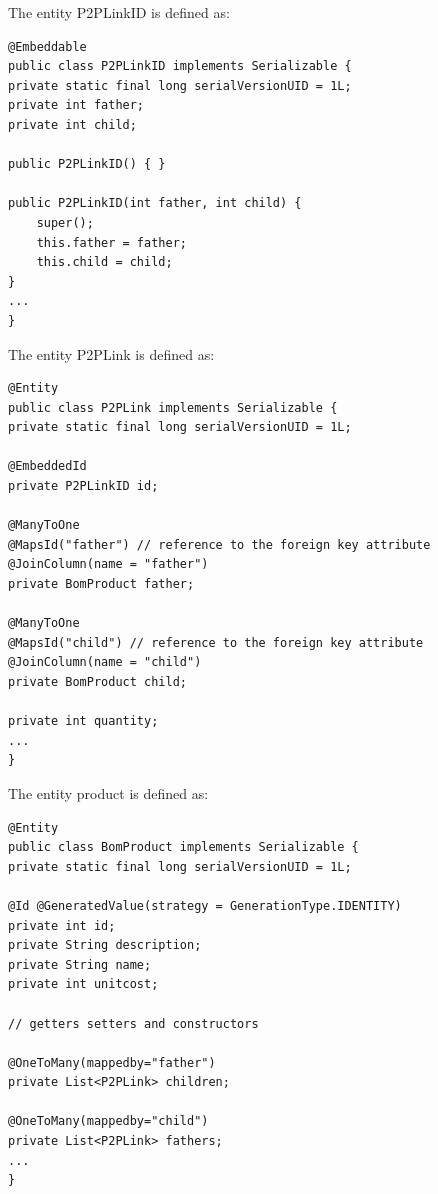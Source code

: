 The entity P2PLinkID is defined as:  
\begin{lstlisting}[style=Java]
@Embeddable
public class P2PLinkID implements Serializable {
private static final long serialVersionUID = 1L;
private int father;
private int child;

public P2PLinkID() { }

public P2PLinkID(int father, int child) {
    super();
    this.father = father;
    this.child = child;
}
...
}
\end{lstlisting}
The entity P2PLink is defined as:  
\begin{lstlisting}[style=Java]
@Entity
public class P2PLink implements Serializable {
private static final long serialVersionUID = 1L;

@EmbeddedId
private P2PLinkID id;

@ManyToOne
@MapsId("father") // reference to the foreign key attribute
@JoinColumn(name = "father")
private BomProduct father;

@ManyToOne
@MapsId("child") // reference to the foreign key attribute
@JoinColumn(name = "child")
private BomProduct child;

private int quantity;
...
}
\end{lstlisting}
The entity product is defined as:  
\begin{lstlisting}[style=Java]
@Entity
public class BomProduct implements Serializable {
private static final long serialVersionUID = 1L;

@Id @GeneratedValue(strategy = GenerationType.IDENTITY)
private int id;
private String description;
private String name;
private int unitcost;

// getters setters and constructors

@OneToMany(mappedby="father")
private List<P2PLink> children;

@OneToMany(mappedby="child")
private List<P2PLink> fathers;
...
}
\end{lstlisting}